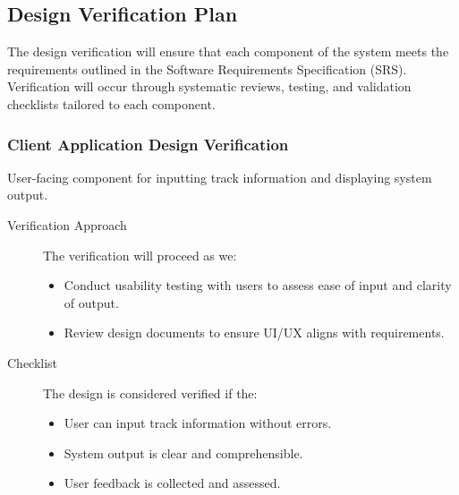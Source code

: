 \documentclass[12pt, titlepage]{article}
\begin{document}
\subsection{Design Verification Plan}

The design verification will ensure that each component of the system meets the requirements outlined in the Software Requirements Specification (SRS). Verification will occur through systematic reviews, testing, and validation checklists tailored to each component.

\subsubsection{Client Application Design Verification}
User-facing component for inputting track information and displaying system output.
\begin{description}
  \item[Verification Approach] The verification will proceed as we:
  
  \begin{itemize}[leftmargin=0cm]
    \item Conduct usability testing with users to assess ease of input and clarity of output.
    \item Review design documents to ensure UI/UX aligns with requirements.
  \end{itemize}
  \item[Checklist] The design is considered verified if the:
  
    \begin{itemize}[label=$\square$,leftmargin=0cm]
    \item User can input track information without errors.
    \item System output is clear and comprehensible.
    \item User feedback is collected and assessed.
  \end{itemize}
\end{description}
\end{document}
